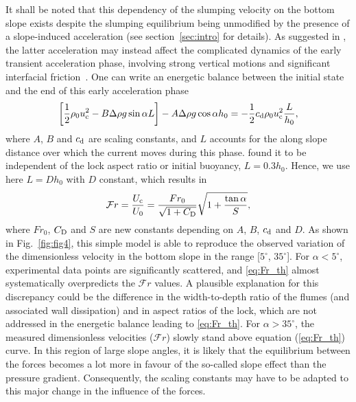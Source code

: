 \documentclass[12pt]{article}
\begin{document}
It shall be noted that this dependency of the slumping velocity on the bottom slope exists despite the slumping equilibrium being unmodified by the presence of a slope-induced acceleration (see section~\ref{sec:intro} for details). As suggested in \citet{Gadal2023}, the latter acceleration may instead affect the complicated dynamics of the early transient acceleration phase, involving strong vertical motions and significant interfacial friction~\citep{Cantero2007}.
%
One can write an energetic balance between the initial state and the end of this early acceleration phase \citep{Gadal2023}
\begin{equation}
	\label{eq:energetic_balance}
	\left[\frac{1}{2}\rho_{0}u_{\text c}^{2} - B \Delta\rho g \sin\alpha L\right] - A \Delta\rho g \cos\alpha h_{0} =  - \frac{1}{2}c_{\text d}\rho_{0}u_{\text c}^{2} \frac{L}{h_{0}},
\end{equation}
where $A$, $B$ and $c_{\text d}$ are scaling constants, and $L$ accounts for the along slope distance over which the current moves during this phase. \citet{Cantero2007} found it to be independent of the lock aspect ratio or initial buoyancy, $L = 0.3 h_{0}$. Hence, we use here $L = D h_{0}$ with $D$ constant, which results in
\begin{equation}
	\label{eq:Fr_th}
	\mathcal{F}r = \frac{U_{\text c}}{U_0} = \frac{Fr_0}{\sqrt{1 + C_{\text D}}} \sqrt{1 + \frac{\tan\alpha}{S}},
\end{equation}
where $Fr_0$, $C_{\text D}$ and $S$ are new constants depending on $A$, $B$, $c_{\text d}$ and $D$. As shown in Fig.~\ref{fig:fig4}, this simple model is able to reproduce the observed variation of the dimensionless velocity in the bottom slope in the range [$5^\circ$, $35^\circ$].
%
For $\alpha < 5^\circ$, experimental data points are significantly scattered, and \eqref{eq:Fr_th} almost systematically overpredicts the $\mathcal{F}r$ values. A plausible explanation for this discrepancy could be the difference in the width-to-depth ratio of the flumes (and associated wall dissipation) and in aspect ratios of the lock, which are not addressed in the energetic balance leading to \eqref{eq:Fr_th}.
%
For $\alpha > 35^\circ$, the measured dimensionless velocities ($\mathcal{F}r$) slowly stand above equation (\ref{eq:Fr_th}) curve. In this region of large slope angles, it is likely that the equilibrium between the forces becomes a lot more in favour of the so-called slope effect than the pressure gradient. Consequently, the scaling constants may have to be adapted to this major change in the influence of the forces.
\end{document}
